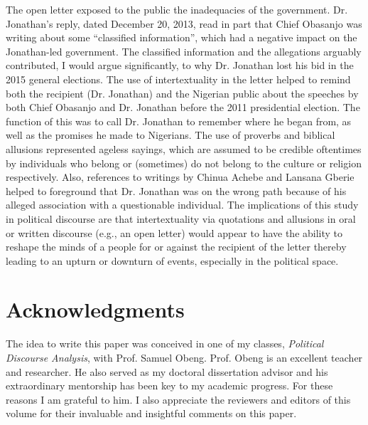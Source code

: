 \documentclass[output=paper,colorlinks,citecolor=brown]{langscibook}
\begin{document}
The open letter exposed to the public the inadequacies of the government. Dr. Jonathan’s reply, dated December 20, 2013, read in part that Chief Obasanjo was writing about some “classified information”, which had a negative impact on the Jonathan-led government. The classified information and the allegations arguably contributed, I would argue significantly, to why Dr. Jonathan lost his bid in the 2015 general elections. The use of intertextuality in the letter helped to remind both the recipient (Dr. Jonathan) and the Nigerian public about the speeches by both Chief Obasanjo and Dr. Jonathan before the 2011 presidential election. The function of this was to call Dr. Jonathan to remember where he began from, as well as the promises he made to Nigerians. The use of proverbs and biblical allusions represented ageless sayings, which are assumed to be credible oftentimes by individuals who belong or (sometimes) do not belong to the culture or religion respectively. Also, references to writings by Chinua Achebe and Lansana Gberie helped to foreground that Dr. Jonathan was on the wrong path because of his alleged association with a questionable individual. The implications of this study in political discourse are that intertextuality via quotations and allusions in oral or written discourse (e.g., an open letter) would appear to have the ability to reshape the minds of a people for or against the recipient of the letter thereby leading to an upturn or downturn of events, especially in the political space.



\section*{Acknowledgments}

The idea to write this paper was conceived in one of my classes, \textit{Political Discourse Analysis}, with Prof. Samuel Obeng. Prof. Obeng is an excellent teacher and researcher. He also served as my doctoral dissertation advisor and his extraordinary mentorship has been key to my academic progress. For these reasons I am grateful to him. I also appreciate the reviewers and editors of this volume for their invaluable and insightful comments on this paper.


{\sloppy\printbibliography[heading=subbibliography,notkeyword=this]}
\end{document}
